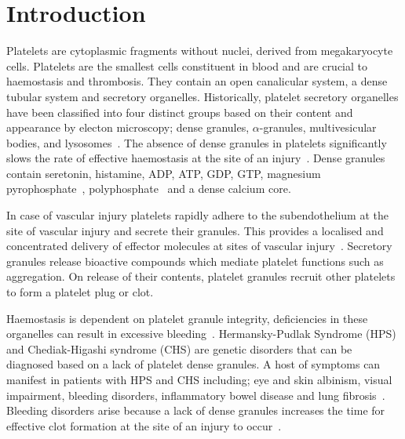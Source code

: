 \section{Introduction}
\label{platelets:introduction}
Platelets are cytoplasmic fragments without nuclei, derived from megakaryocyte cells. Platelets are the smallest cells constituent in blood and are crucial to haemostasis and thrombosis. They contain an open canalicular system, a dense tubular system and secretory organelles. Historically, platelet secretory organelles have been classified into four distinct groups based on their content and appearance by electon microscopy; dense granules, $\alpha$-granules, multivesicular bodies, and lysosomes~\cite{VanNispenTotPannerden2010}. The absence of dense granules in platelets significantly slows the rate of effective haemostasis at the site of an injury~\cite{Seward2013}. Dense granules contain seretonin, histamine, ADP, ATP, GDP, GTP, magnesium pyrophosphate~\cite{Rendu2001}, polyphosphate~\cite{Ruiz2004} and a dense calcium core.

In case of vascular injury platelets rapidly adhere to the subendothelium at the site of vascular injury and secrete their granules. This provides a localised and concentrated delivery of effector molecules at sites of vascular injury~\cite{Reed2000}. Secretory granules release bioactive compounds which mediate platelet functions such as aggregation. On release of their contents, platelet granules recruit other platelets to form a platelet plug or clot.

Haemostasis is dependent on platelet granule integrity, deficiencies in these organelles can result in excessive bleeding~\cite{Nurden2014}. Hermansky-Pudlak Syndrome (HPS) and Chediak-Higashi syndrome (CHS) are genetic disorders that can be diagnosed based on a lack of platelet dense granules. A host of symptoms can manifest in patients with HPS and CHS including; eye and skin albinism, visual impairment, bleeding disorders, inflammatory bowel disease and lung fibrosis~\cite{Wei2006}. Bleeding disorders arise because a lack of dense granules increases the time for effective clot formation at the site of an injury to occur~\cite{Seward2013}.


